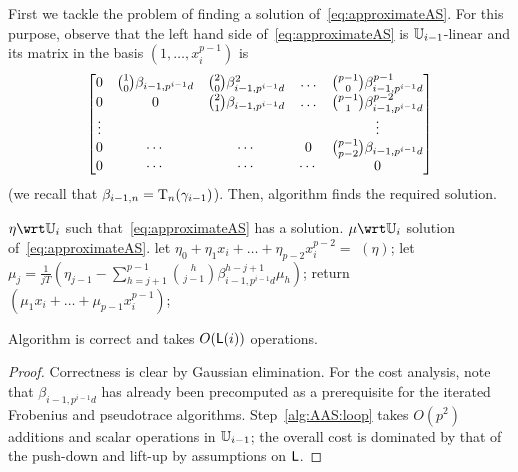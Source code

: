 First we tackle the problem of finding a solution
of~\eqref{eq:approximateAS}.  For this purpose, observe that the left
hand side of~\eqref{eq:approximateAS} is $\mathbb{U}_{i-1}$-linear and its
matrix in the basis $(1,\ldots,x_i^{p-1})$ is
\begin{equation}
  \pdfmctwo{More entries in the matrix.}
  \label{eq:approximate-matrix}
  \begin{bmatrix}
    0 & \binom{1}{0}\beta_{i-1,p^{i-1}d} & \binom{2}{0}\beta_{i-1,p^{i-1}d}^2 & \hdots & \binom{p-1}{0}\beta_{i-1,p^{i-1}d}^{p-1} \\
    0 & 0 & \binom{2}{1}\beta_{i-1,p^{i-1}d} & \hdots & \binom{p-1}{1}\beta_{i-1,p^{i-1}d}^{p-2}\\
    \vdots  &&         &        & \vdots               \\
    0 & \cdots & \cdots  & 0      &\binom{p-1}{p-2}\beta_{i-1,p^{i-1}d} \\
    0 & \cdots & \cdots  & \cdots & 0
  \end{bmatrix}
\end{equation}
(we recall that $\beta_{i-1,n}=\operatorname{T}_{n}(\gamma_{i-1})$).  Then,
algorithm  finds the required solution.



\begin{algorithm}
  \caption{} 
  \label{alg:approximateas}
  \begin{algorithmic}[1]
    \REQUIRE $\eta\wrt\U_i$ such that~\eqref{eq:approximateAS} has a solution.
    \ENSURE $\mu\wrt\U_i$ solution of~\eqref{eq:approximateAS}.
    \STATE let $\eta_0 + \eta_1 x_i + \dots + \eta_{p-2} x_i^{p-2}=$ $(\eta)$;
    \STATE let $\mu_j =
   \frac{1}{jT}\left(\eta_{j-1} -
     \sum_{h=j+1}^{p-1}\binom{h}{j-1}\beta_{i-1,p^{i-1}d}^{h-j+1}\mu_h\right)$;
   \ENDFOR
   \STATE return $(\mu_1 x_i + \ldots + \mu_{p-1} x_i^{p-1})$;
\end{algorithmic}
\end{algorithm}


\begin{theorem}
  \label{th:approximateAS}
  Algorithm  is correct and takes
  $O(\mathsf{L}(i))$ operations.
\end{theorem}

\begin{proof}
  Correctness is clear by Gaussian elimination.  For the cost
  analysis, note that $\beta_{i-1,p^{i-1}d}$ has already been
  precomputed as a prerequisite for the iterated Frobenius and
  pseudotrace algorithms. Step~\ref{alg:AAS:loop} takes $O(p^2)$
  additions and scalar operations in $\mathbb{U}_{i-1}$; the overall cost is
  dominated by that of the push-down and lift-up by assumptions on
  $\mathsf{L}$.
\end{proof}

